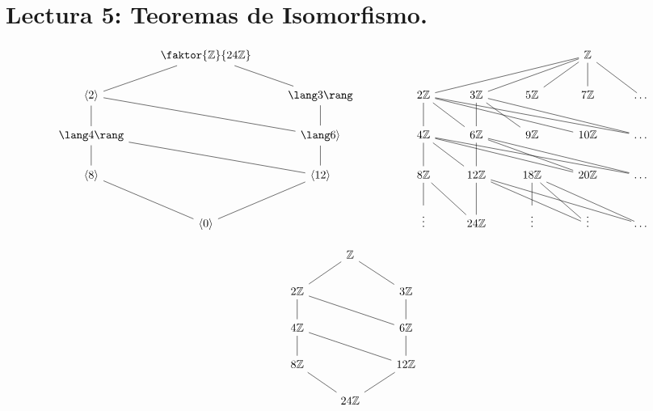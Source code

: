 \section*{Lectura 5: Teoremas de Isomorfismo.}

\[\begin{tikzcd}
	& {\faktor{\Z}{24\Z}} &&&&&& \Z \\
	{\langle 2 \rangle} && {\lang 3 \rang} && 2\Z & 3\Z & 5\Z & 7\Z & \dots \\
	{\lang 4 \rang} && {\lang 6 \rangle} && 4\Z & 6\Z & 9\Z & 10\Z & \dots \\
	{\langle 8 \rangle} && \langle12\rangle && 8\Z & 12\Z & 18\Z & 20\Z & \dots \\
	& {\langle 0 \rangle} &&& \vdots & 24\Z & \vdots & \vdots & \dots
	\arrow[no head, from=1-2, to=2-1]
	\arrow[no head, from=2-1, to=3-1]
	\arrow[no head, from=3-1, to=4-1]
	\arrow[no head, from=4-1, to=5-2]
	\arrow[no head, from=5-2, to=4-3]
	\arrow[no head, from=4-3, to=3-1]
	\arrow[no head, from=4-3, to=3-3]
	\arrow[no head, from=3-3, to=2-3]
	\arrow[no head, from=2-3, to=1-2]
	\arrow[no head, from=2-1, to=3-3]
	\arrow[no head, from=1-8, to=2-5]
	\arrow[no head, from=1-8, to=2-6]
	\arrow[no head, from=1-8, to=2-7]
	\arrow[no head, from=1-8, to=2-8]
	\arrow[no head, from=1-8, to=2-9]
	\arrow[no head, from=2-5, to=3-5]
	\arrow[no head, from=2-5, to=3-6]
	\arrow[no head, from=2-5, to=3-8]
	\arrow[no head, from=2-5, to=3-9]
	\arrow[no head, from=2-6, to=3-6]
	\arrow[no head, from=2-6, to=3-7]
	\arrow[no head, from=2-6, to=3-9]
	\arrow[no head, from=3-5, to=4-5]
	\arrow[no head, from=3-5, to=4-6]
	\arrow[no head, from=3-5, to=4-8]
	\arrow[no head, from=3-5, to=4-9]
	\arrow[no head, from=4-5, to=5-5]
	\arrow[no head, from=4-7, to=5-8]
	\arrow[no head, from=4-7, to=5-9]
	\arrow[no head, from=4-6, to=5-6]
	\arrow[no head, from=4-5, to=5-6]
	\arrow[no head, from=4-6, to=5-8]
	\arrow[no head, from=4-7, to=5-7]
	\arrow[no head, from=3-6, to=4-6]
	\arrow[no head, from=3-6, to=4-8]
	\arrow[no head, from=3-6, to=4-9]
	\arrow[no head, from=4-6, to=5-9]
\end{tikzcd}\]

\[\begin{tikzcd}
	& \Z \\
	2\Z && 3\Z \\
	4\Z && 6\Z \\
	8\Z && 12\Z \\
	& 24\Z
	\arrow[no head, from=1-2, to=2-1]
	\arrow[no head, from=2-1, to=3-3]
	\arrow[no head, from=3-3, to=4-3]
	\arrow[no head, from=4-3, to=3-1]
	\arrow[no head, from=3-1, to=4-1]
	\arrow[no head, from=4-1, to=5-2]
	\arrow[no head, from=5-2, to=4-3]
	\arrow[no head, from=3-3, to=2-3]
	\arrow[no head, from=2-3, to=1-2]
	\arrow[no head, from=2-1, to=3-1]
\end{tikzcd}\]
